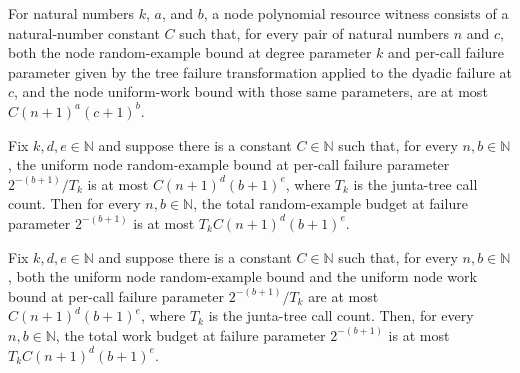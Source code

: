 \begin{definition}
\label{FABL.LowDegreeJuntaNodePolynomialWitness}
\leanok
{}
For natural numbers $k$, $a$, and $b$, a node polynomial resource witness consists of a
natural-number constant $C$ such that, for every pair of natural numbers $n$ and $c$,
both the node random-example bound at degree parameter $k$ and per-call failure
parameter given by the tree failure transformation applied to the dyadic failure at $c$,
and the node uniform-work bound with those same parameters, are at most
$C(n+1)^a(c+1)^b$.
\end{definition}

\begin{theorem}
\label{FABL.lowDegreeJuntaTotalRandomExampleBudget_le_of_polynomialWitness}
\leanok
{}
Fix $k,d,e\in\mathbb{N}$ and suppose there is a constant $C\in\mathbb{N}$ such that, for
every $n,b\in\mathbb{N}$, the uniform node random-example bound at per-call failure
parameter $2^{-(b+1)}/T_k$ is at most $C(n+1)^d(b+1)^e$, where $T_k$ is the junta-tree
call count. Then for every $n,b\in\mathbb{N}$, the total random-example budget at
failure parameter $2^{-(b+1)}$ is at most $T_k C(n+1)^d(b+1)^e$.
\end{theorem}

\begin{theorem}
\label{FABL.lowDegreeJuntaTotalWorkBudget_le_of_polynomialWitness}
\leanok
{}
Fix $k,d,e\in\mathbb{N}$ and suppose there is a constant $C\in\mathbb{N}$ such that, for
every $n,b\in\mathbb{N}$, both the uniform node random-example bound and the uniform
node work bound at per-call failure parameter $2^{-(b+1)}/T_k$ are at most
$C(n+1)^d(b+1)^e$, where $T_k$ is the junta-tree call count. Then, for every
$n,b\in\mathbb{N}$, the total work budget at failure parameter $2^{-(b+1)}$ is at most
$T_k C(n+1)^d(b+1)^e$.
\end{theorem}

